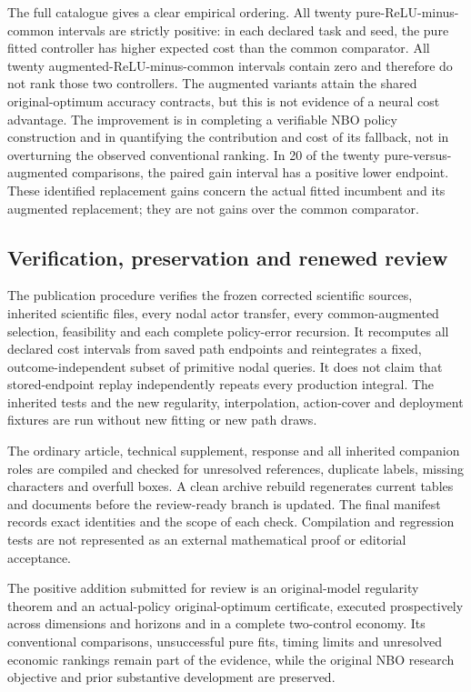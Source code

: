 The full catalogue gives a clear empirical ordering. All twenty
pure-ReLU-minus-common intervals are strictly positive: in each declared
task and seed, the pure fitted controller has higher expected cost than
the common comparator. All twenty augmented-ReLU-minus-common intervals
contain zero and therefore do not rank those two controllers. The
augmented variants attain the shared original-optimum accuracy
contracts, but this is not evidence of a neural cost advantage. The
improvement is in completing a verifiable NBO policy construction and in
quantifying the contribution and cost of its fallback, not in
overturning the observed conventional ranking. In 20 of the twenty
pure-versus-augmented comparisons, the paired gain interval has a
positive lower endpoint. These identified replacement gains concern the
actual fitted incumbent and its augmented replacement; they are not
gains over the common comparator.

\hypertarget{verification-preservation-and-renewed-review}{%
\subsection{Verification, preservation and renewed
review}\label{verification-preservation-and-renewed-review}}

The publication procedure verifies the frozen corrected scientific
sources, inherited scientific files, every nodal actor transfer, every
common-augmented selection, feasibility and each complete policy-error
recursion. It recomputes all declared cost intervals from saved path
endpoints and reintegrates a fixed, outcome-independent subset of
primitive nodal queries. It does not claim that stored-endpoint replay
independently repeats every production integral. The inherited tests and
the new regularity, interpolation, action-cover and deployment fixtures
are run without new fitting or new path draws.

The ordinary article, technical supplement, response and all inherited
companion roles are compiled and checked for unresolved references,
duplicate labels, missing characters and overfull boxes. A clean archive
rebuild regenerates current tables and documents before the review-ready
branch is updated. The final manifest records exact identities and the
scope of each check. Compilation and regression tests are not
represented as an external mathematical proof or editorial acceptance.

The positive addition submitted for review is an original-model
regularity theorem and an actual-policy original-optimum certificate,
executed prospectively across dimensions and horizons and in a complete
two-control economy. Its conventional comparisons, unsuccessful pure
fits, timing limits and unresolved economic rankings remain part of the
evidence, while the original NBO research objective and prior
substantive development are preserved.
